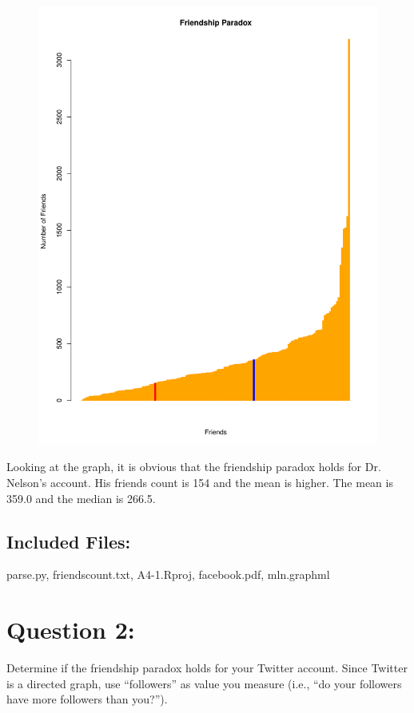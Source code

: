 \documentclass[a4paper, 11pt]{article}
\begin{document}
\begin{figure}[H]
\centering
\includegraphics[scale=0.6]{facebook.pdf}
\end{figure}

Looking at the graph, it is obvious that the friendship paradox holds for Dr. Nelson’s account. His friends count is 154 and the mean is higher. The mean is 359.0 and the median is 266.5.


\subsection*{Included Files:}
parse.py, friendscount.txt, A4-1.Rproj, facebook.pdf, mln.graphml

\section*{Question 2:}
Determine if the friendship paradox holds for your Twitter account.
Since Twitter is a directed graph, use ``followers'' as value you measure
(i.e., ``do your followers have more followers than you?'').
\end{document}
